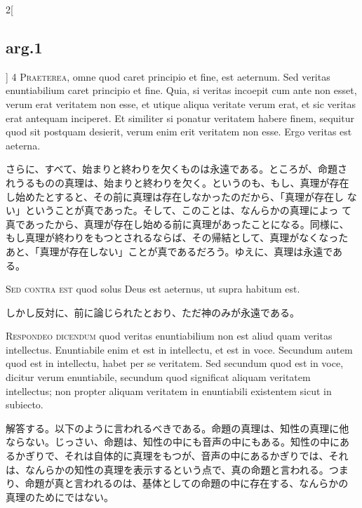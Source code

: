 \documentclass[paper=a4paper,fontsize=10pt,jafontsize=9pt,titlepage]{jlreq}
\begin{document}
\begin{paracol}{2}[\subsection{arg.1}]
{\scshape 4 Praeterea}, omne quod caret principio et fine, est
aeternum. Sed veritas enuntiabilium caret principio et fine. Quia, si
veritas incoepit cum ante non esset, verum erat veritatem non esse, et
utique aliqua veritate verum erat, et sic veritas erat antequam
inciperet. Et similiter si ponatur veritatem habere finem, sequitur
quod sit postquam desierit, verum enim erit veritatem non esse. Ergo
veritas est aeterna.

\switchcolumn

さらに、すべて、始まりと終わりを欠くものは永遠である。ところが、命題さ
れうるものの真理は、始まりと終わりを欠く。というのも、もし、真理が存在
し始めたとすると、その前に真理は存在しなかったのだから、「真理が存在し
ない」ということが真であった。そして、このことは、なんらかの真理によっ
て真であったから、真理が存在し始める前に真理があったことになる。同様に、
もし真理が終わりをもつとされるならば、その帰結として、真理がなくなった
あと、「真理が存在しない」ことが真であるだろう。ゆえに、真理は永遠であ
る。

\switchcolumn*[\subsection{s.c.}]


{\scshape Sed contra est} quod solus Deus est aeternus, ut supra
 habitum est.

\switchcolumn

しかし反対に、前に論じられたとおり、ただ神のみが永遠である。



{\scshape Respondeo dicendum} quod veritas enuntiabilium non est aliud
quam veritas intellectus. Enuntiabile enim et est in intellectu, et
est in voce. Secundum autem quod est in intellectu, habet per se
veritatem. Sed secundum quod est in voce, dicitur verum enuntiabile,
secundum quod significat aliquam veritatem intellectus; non propter
aliquam veritatem in enuntiabili existentem sicut in subiecto.

\switchcolumn

解答する。以下のように言われるべきである。命題の真理は、知性の真理に他
ならない。じっさい、命題は、知性の中にも音声の中にもある。知性の中にあ
るかぎりで、それは自体的に真理をもつが、音声の中にあるかぎりでは、それ
は、なんらかの知性の真理を表示するという点で、真の命題と言われる。つま
り、命題が真と言われるのは、基体としての命題の中に存在する、なんらかの
真理のためにではない。


\end{paracol}
\end{document}
